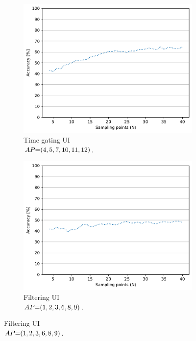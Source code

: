 \begin{figure}[ht]
  \begin{subfigure}{.49\textwidth}
    \centering
    \includegraphics[width=.99\linewidth]{Figures/RadarExperiments/Datasets/ThroughMaterials/PVC/samples-timegating-ui.pdf}
    \vspace{-15pt}
    \captionsetup{width=.99\linewidth}
    \caption{Time gating UI \\ $\splitatcommas{AP{=}(4, 5, 7, 10, 11, 12)}$.}
    \label{fig:radar-experiments:through-materials:pvc-samples:timegating-ui}
  \end{subfigure}
  \begin{subfigure}{.49\textwidth}
    \centering
    \includegraphics[width=.99\linewidth]{Figures/RadarExperiments/Datasets/ThroughMaterials/PVC/samples-filtering-ui.pdf}  
    \vspace{-15pt}
    \captionsetup{width=.99\linewidth}
    \caption{Filtering UI \\ $\splitatcommas{AP{=}(1, 2, 3, 6, 8, 9)}$.}
    \label{fig:radar-experiments:through-materials:pvc-samples:filtering-ui}
  \end{subfigure}


\end{figure}
